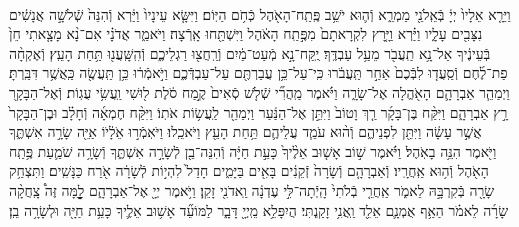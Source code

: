 \documentclass[twoside, openany, parskip=half, 11pt]{book}
\begin{document}
\begin{footnotesize}
\begin{multicols}{2}
\\
וַיֵּרָ֤א אֵלָיו֙ יְיָ֔ בְּֿאֵֽלֹנֵ֖י מַמְרֵ֑א וְֿה֛וּא יֹשֵׁ֥ב פֶּֽתַֽח־הָאֹ֖הֶל כְּֿחֹ֥ם הַיּֽוֹם׃ וַיִּשָּׂ֤א עֵינָיו֙ וַיַּ֔רְא וְֿהִנֵּה֙ שְֿׁלֹשָׁ֣ה אֲנָשִׁ֔ים נִצָּבִ֖ים עָלָ֑יו וַיַּ֗רְא וַיָּ֤רָץ לִקְרָאתָם֙ מִפֶּ֣תַֽח הָאֹ֔הֶל וַיִּשְׁתַּ֖חוּ אָֽרְֿצָה׃ וַיֹּאמַ֑ר אֲדֹנָ֗י אִם־נָ֨א מָצָ֤אתִי חֵן֙ בְּֿעֵינֶ֔יךָ אַל־נָ֥א תַֽעֲבֹ֖ר מֵעַ֥ל עַבְדֶּֽךָ׃
יֻֽקַּח־נָ֣א מְֿעַט־מַ֔יִם וְֿרַֽחֲצ֖וּ רַגְלֵיכֶ֑ם וְֿהִֽשָּֽׁעֲנ֖וּ תַּ֥חַת הָעֵֽץ׃ וְֿאֶקְחָ֨ה פַת־לֶ֜חֶם וְֿסַֽעֲד֤וּ לִבְּֿכֶם֙ אַחַ֣ר תַּֽעֲבֹ֔רוּ כִּֽי־עַל־כֵּ֥ן עֲבַרְתֶּ֖ם עַל־עַבְדְּֿכֶ֑ם וַיֹּ֣אמְֿר֔וּ כֵּ֥ן תַּֽעֲשֶׂ֖ה כַּֽאֲשֶׁ֥ר דִּבַּֽרְתָּ׃
וַיְמַהֵ֧ר אַבְרָהָ֛ם הָאֹ֖הֱלָה אֶל־שָׂרָ֑ה וַיֹּ֗אמֶר מַֽהֲרִ֞י שְֿׁלֹ֤שׁ סְֿאִים֙ קֶ֣מַח סֹ֔לֶת ל֖וּשִׁי וַֽעֲשִׂ֥י עֻגֽוֹת׃ וְֿאֶל־הַבָּקָ֖ר רָ֣ץ אַבְרָהָ֑ם וַיִּקַּ֨ח בֶּן־בָּקָ֜ר רַ֤ךְ וָטוֹב֙ וַיִּתֵּ֣ן אֶל־הַנַּ֔עַר וַיְמַהֵ֖ר לַֽעֲשׂ֥וֹת אֹתֽוֹ׃ וַיִּקַּ֨ח חֶמְאָ֜ה וְֿחָלָ֗ב וּבֶן־הַבָּקָר֙ אֲשֶׁ֣ר עָשָׂ֔ה וַיִּתֵּ֖ן לִפְנֵיהֶ֑ם וְֿה֨וּא עֹמֵ֧ד עֲלֵיהֶ֛ם תַּ֥חַת הָעֵ֖ץ וַיֹּאכֵֽלוּ׃  וַיֹּאֽמְֿר֣וּ אֵֹלָ֔יֹוֹ אַיֵּ֖ה שָׂרָ֣ה אִשְׁתֶּ֑ךָ וַיֹּ֖אמֶר הִנֵּ֥ה בָאֹֽהֶל׃ וַיֹּ֗אמֶר שׁ֣וֹב אָשׁ֤וּב אֵלֶ֨יךָ֙ כָּעֵ֣ת חַיָּ֔ה וְֿהִנֵּה־בֵ֖ן לְֿשָׂרָ֣ה אִשְׁתֶּ֑ךָ וְֿשָׂרָ֥ה שֹׁמַ֛עַת פֶּ֥תַֽח הָאֹ֖הֶל וְֿה֥וּא אַֽחֲרָֽיו׃ וְֿאַבְרָהָ֤ם וְֿשָׂרָה֙ זְֿקֵנִ֔ים בָּאִ֖ים בַּיָּמִ֑ים חָדַל֙ לִהְי֣וֹת לְֿשָׂרָ֔ה אֹ֖רַח כַּנָּשִֽׁים׃ וַתִּצְחַ֥ק שָׂרָ֖ה בְּֿקִרְבָּ֣הּ לֵאמֹ֑ר אַֽחֲרֵ֤י בְֿלֹתִי֙ הָֽיְֿתָה־לִּ֣י עֶדְנָ֔ה וַֽאדֹנִ֖י זָקֵֽן׃ וַיֹּ֥אמֶר יְיָ֖ אֶל־אַבְרָהָ֑ם לׇׇׇׇׇׇָ֣מָּה זֶּה֩ צָֽחֲקָ֨ה שָׂרָ֜ה לֵאמֹ֗ר הַאַ֥ף אֻמְנָ֛ם אֵלֵ֖ד וַֽאֲנִ֥י זָקַֽנְתִּי׃ הֲיִפָּלֵ֥א מֵֽיְיָ֖ דָּבָ֑ר לַמּוֹעֵ֞ד אָשׁ֥וּב אֵלֶ֛יךָ כָּעֵ֥ת חַיָּ֖ה וּלְשָׂרָ֥ה בֵֽן׃


\end{multicols}
\end{footnotesize}
\end{document}
